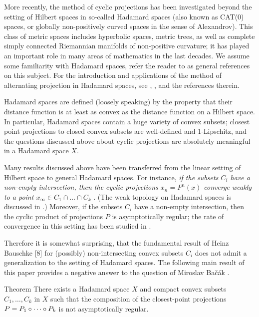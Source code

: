 \documentclass[a4paper,10pt]{article}
\begin{document}
More recently, the method of cyclic  projections has been investigated beyond the setting of Hilbert spaces in so-called Hadamard spaces (also known as CAT(0) spaces, or globally non-positively curved spaces in the sense of Alexandrov).
This class of metric spaces includes hyperbolic spaces, metric trees, as well as complete simply connected Riemannian manifolds of non-positive curvature;
it has played an important role in many areas of mathematics  in the last decades.
We assume some familiarity with Hadamard spaces, refer the reader to \cite{BBI,BH,AKP,AKP_inv} as general references on this subject.
For the introduction and applications of the method of alternating projection in Hadamard spaces,
see \cite{bachak-book}, \cite[Section 6.8]{Bac}, and the references therein.

Hadamard spaces are defined (loosely speaking) by the property that their distance function is at least as convex as the distance function on a Hilbert space.
In particular, Hadamard spaces contain a huge variety of convex subsets;
closest point projections to closed convex subsets are well-defined and $1$-Lipschitz,
and the questions discussed above about cyclic projections are absolutely meaningful in a Hadamard space $X$.

Many results discussed above have been transferred from the linear setting of Hilbert space
to general Hadamard spaces.
For instance, \emph{if the subsets $C_i$ have a non-empty intersection, then 
the cyclic projections $x_n=P^n (x)$ converge \emph{weakly} to a point $x_{\infty} \in C_1\cap \dots\cap C_k$}
\cite{asymptotic, Bac2}.
(The weak topology on Hadamard spaces is discussed in \cite{Bac, bachak-book, lytchak-petrunin}.)
Moreover, if the  subsets $C_i$ have a non-empty intersection, then the cyclic product of projections $P$ is asymptotically regular;
the rate of convergence in this setting has been studied in \cite{KLN}.

Therefore it is somewhat surprising, that the fundamental result of Heinz Bauschke [8] for (possibly) non-intersecting convex subsets $C_i$ does not admit  a generalization to the
 setting of Hadamard spaces.  The following main result of this paper provides a negative answer to  the question of Miroslav Bačák \cite[Problem 6.13]{Bac}.

\begin{thm}{Theorem}\label{thm}
There exists a Hadamard space $X$ and compact convex subsets $C_1,\dots,C_k$ in $X$ such that the composition of the closest-point projections $P\z= P_1\circ \dots \circ P_k$ is not asymptotically regular.
\end{thm}
\end{document}
